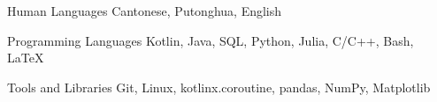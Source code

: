

\begin{cvskills}

  \cvskill
    {Human Languages} %
    {Cantonese, Putonghua, English} %

  \cvskill
    {Programming Languages} %
    {Kotlin, Java, SQL, Python, Julia, C/C++, Bash, \LaTeX} %

  \cvskill
    {Tools and Libraries} %
    {Git, Linux, kotlinx.coroutine, pandas, NumPy, Matplotlib} %

\end{cvskills}
